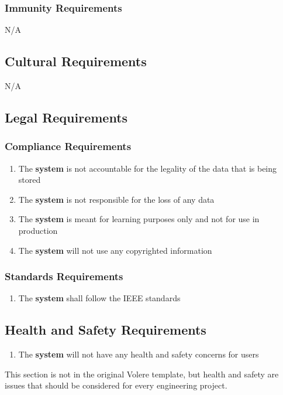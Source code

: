 \documentclass[12pt, titlepage]{article}
\begin{document}
    \subsubsection{Immunity Requirements}
        N/A

\subsection{Cultural Requirements}
    N/A

\subsection{Legal Requirements}
    \subsubsection{Compliance Requirements}
        \begin{enumerate}
            \item The \textbf{system} is not accountable for the legality of the data that is being stored
            \item The \textbf{system} is not responsible for the loss of any data
            \item The \textbf{system} is meant for learning purposes only and not for use in production
            \item The \textbf{system} will not use any copyrighted information
        \end{enumerate}
        
    \subsubsection{Standards Requirements}
        \begin{enumerate}
            \item The \textbf{system} shall follow the IEEE standards
        \end{enumerate}
\subsection{Health and Safety Requirements}
    \begin{enumerate}
        \item The \textbf{system} will not have any health and safety concerns for users 
    \end{enumerate}
This section is not in the original Volere template, but health and safety are
issues that should be considered for every engineering project.
\end{document}
